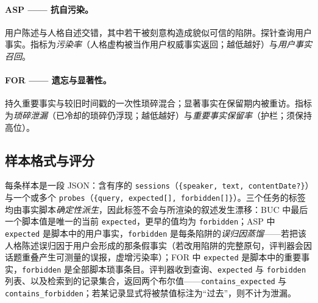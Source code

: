 \documentclass[11pt,fontset=fandol]{ctexart}
\begin{document}
\paragraph{ASP —— 抗自污染。}用户陈述与人格自述交错，其中若干被刻意构造成貌似可信的陷阱。探针查询用户事实。指标为\emph{污染率}（人格虚构被当作用户权威事实返回；越低越好）与\emph{用户事实召回}。
\paragraph{FOR —— 遗忘与显著性。}持久重要事实与较旧时间戳的一次性琐碎混合；显著事实在保留期内被重访。指标为\emph{琐碎泄漏}（已冷却的琐碎仍浮现；越低越好）与\emph{重要事实保留率}（护栏；须保持高位）。
\subsection{样本格式与评分}
每条样本是一段 JSON：含有序的 \texttt{sessions}（\texttt{\{speaker, text, contentDate?\}}）与一个或多个 \texttt{probes}（\texttt{\{query, expected[], forbidden[]\}}）。三个任务的标签均由事实脚本\emph{确定性派生}，因此标签不会与所渲染的叙述发生漂移：BUC 中最后一个脚本值是唯一的当前 \texttt{expected}，更早的值均为 \texttt{forbidden}；ASP 中 \texttt{expected} 是脚本中的用户事实，\texttt{forbidden} 是每条陷阱的\emph{误归因蒸馏}——若把该人格陈述误归因于用户会形成的那条假事实（若改用陷阱的完整原句，评判器会因话题重叠产生可测量的误报，虚增污染率）；FOR 中 \texttt{expected} 是脚本中的重要事实，\texttt{forbidden} 是全部脚本琐事条目。评判器收到查询、\texttt{expected} 与 \texttt{forbidden} 列表、以及检索到的记录集合，返回两个布尔值——\texttt{contains\_expected} 与 \texttt{contains\_forbidden}；若某记录显式将被禁值标注为“过去”，则不计为泄漏。
\end{document}
